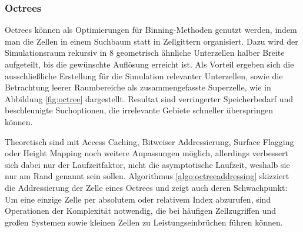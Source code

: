 \subsubsection{Octrees}\label{dataoctree}
Octrees können als Optimierungen für Binning-Methoden genutzt werden, indem man die Zellen in einem Suchbaum statt in Zellgittern organisiert.
Dazu wird der Simulationsraum rekursiv in 8 geometrisch ähnliche Unterzellen halber Breite aufgeteilt, bis die gewünschte Auflösung erreicht ist.
Als Vorteil ergeben sich die ausschließliche Erstellung für die Simulation relevanter Unterzellen, sowie die Betrachtung leerer Raumbereiche als zusammengefasste Superzelle, wie in Abbildung \ref{fig:octree} dargestellt.
Resultat sind verringerter Speicherbedarf und beschleunigte Suchoptionen, die irrelevante Gebiete schneller überspringen können.

Theoretisch sind mit Access Caching, Bitweiser Addressierung, Surface Flagging oder Height Mapping noch weitere Anpassungen möglich, allerdings verbessert sich dabei nur der Laufzeitfaktor, nicht die asymptotische Laufzeit, weshalb sie nur am Rand genannt sein sollen.
Algorithmus \ref{algo:octreeaddressing} skizziert die Addressierung der Zelle eines Octrees und zeigt auch deren Schwachpunkt:
Um eine einzige Zelle per absolutem oder relativem Index abzurufen, sind Operationen der Komplexität  notwendig, die bei häufigen Zellzugriffen und großen Systemen sowie kleinen Zellen zu Leistungseinbrüchen führen können.


